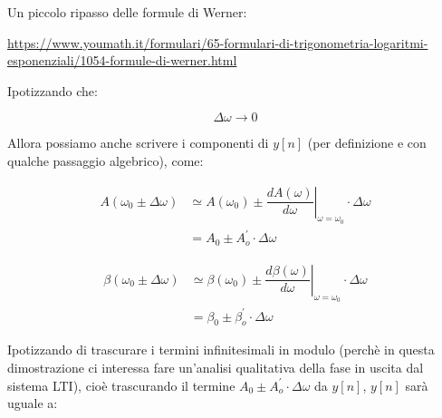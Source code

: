 \begin{tcolorbox}
    Un piccolo ripasso delle formule di Werner: \newline 

    \url{https://www.youmath.it/formulari/65-formulari-di-trigonometria-logaritmi-esponenziali/1054-formule-di-werner.html}
\end{tcolorbox}

Ipotizzando che: 

{
    \Large 
    \begin{equation}
        \Delta \omega \to 0
    \end{equation}
}

Allora possiamo anche scrivere i componenti di $y \left[ n\right]$ (per definizione e con qualche passaggio algebrico), come: 

{
    \Large 
    \begin{equation}
        \begin{split}
        A \left( \omega_0 \pm \Delta \omega \right)
        &\simeq
        A \left(\omega_0\right)
        \pm 
        \left.
        \dfrac{d A \left(\omega\right)}{d \omega}
        \right|_{\omega = \omega_0}
        \cdot 
        \Delta \omega
        \\
        &= 
        A_0 \pm A_o^{'} \cdot \Delta \omega 
        \end{split} 
    \end{equation}
}

{
    \Large 
    \begin{equation}
        \begin{split}
        \beta \left( \omega_0 \pm \Delta \omega \right)
        &\simeq
        \beta \left(\omega_0\right)
        \pm 
        \left.
        \dfrac{d \beta \left(\omega\right)}{d \omega}
        \right|_{\omega = \omega_0}
        \cdot 
        \Delta \omega
        \\
        &= 
        \beta_0 \pm \beta_o^{'} \cdot \Delta \omega 
        \end{split} 
    \end{equation}
}

Ipotizzando di trascurare i termini infinitesimali in modulo (perchè in questa dimostrazione ci interessa fare un'analisi qualitativa della fase in uscita dal sistema LTI), 
cioè trascurando il termine $A_0 \pm A_o^{'} \cdot \Delta \omega$ da $y \left[ n\right]$, 
$y \left[ n\right]$ sarà uguale a: 

